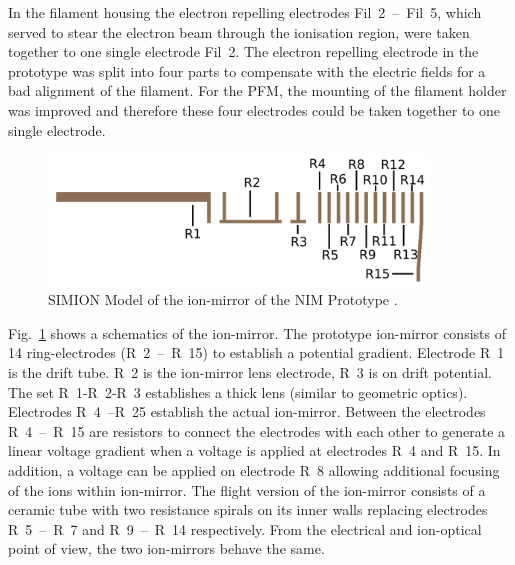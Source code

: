	In the filament housing the electron repelling electrodes Fil~2~--~Fil~5, which served to stear the electron beam through the ionisation region, were taken together to one single electrode Fil~2. The electron repelling electrode in the prototype was split into four parts to compensate with the electric fields for a bad alignment of the filament. For the PFM, the mounting of the filament holder was improved and therefore these four electrodes could be taken together to one single electrode.\\
	\begin{figure}[h!] %
		\centering
		\includegraphics[width=0.9\textwidth]{Setup/Prototype_Reflectron_sim.png}
		\caption{SIMION Model of the ion-mirror of the NIM Prototype \cite{Diss_Meyer}.}
		\label{fig:SetupProtoReflSim}
	\end{figure}
	Fig.~\ref{fig:SetupProtoReflSim} shows a schematics of the ion-mirror. The prototype ion-mirror consists of 14 ring-electrodes (R~2~--~R~15) to establish a potential gradient. Electrode R~1 is the drift tube. R~2 is the ion-mirror lens electrode, R~3 is on drift potential. The set R~1-R~2-R~3 establishes a thick lens (similar to geometric optics). Electrodes R~4~--R~25 establish the actual ion-mirror. Between the electrodes R~4~--~R~15 are resistors to connect the electrodes with each other to generate a linear voltage gradient when a voltage is applied at electrodes R~4 and R~15. In addition, a voltage can be applied on electrode R~8 allowing additional focusing of the ions within ion-mirror. The flight version of the ion-mirror consists of a ceramic tube with two resistance spirals on its inner walls replacing electrodes R~5~--~R~7 and R~9~--~R~14 respectively. From the electrical and ion-optical point of view, the two ion-mirrors behave the same.\\

